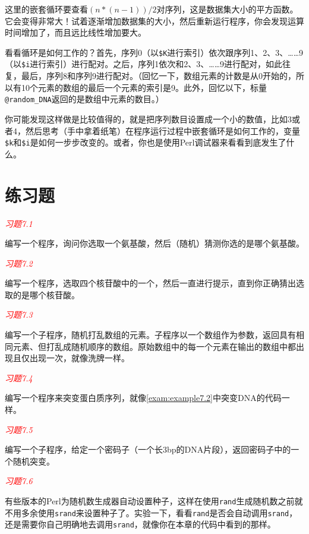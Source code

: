 这里的嵌套循环要查看$(n * (n-1)) / 2$对序列，这是数据集大小的平方函数。它会变得非常大！试着逐渐增加数据集的大小，然后重新运行程序，你会发现运算时间增加了，而且远比线性增加要大。

看看循环是如何工作的？首先，序列0（以\verb|$K|进行索引）依次跟序列1、2、3、……9（以\verb|$i|进行索引）进行配对。之后，序列1依次和2、3、……9进行配对，如此往复，最后，序列8和序列9进行配对。（回忆一下，数组元素的计数是从0开始的，所以有10个元素的数组的最后一个元素的索引是9。此外，回忆以下，标量\verb|@random_DNA|返回的是数组中元素的数目。）

你可能发现这样做是比较值得的，就是把序列数目设置成一个小的数值，比如3或者4，然后思考（手中拿着纸笔）在程序运行过程中嵌套循环是如何工作的，变量\verb|$k|和\verb|$i|是如何一步步改变的。或者，你也是使用Perl调试器来看看到底发生了什么。

\section{练习题}
\textcolor{red}{\textit{习题7.1}}
\begin{adjustwidth}{4em}{}
编写一个程序，询问你选取一个氨基酸，然后（随机）猜测你选的是哪个氨基酸。
\end{adjustwidth}

\textcolor{red}{\textit{习题7.2}}
\begin{adjustwidth}{4em}{}
编写一个程序，选取四个核苷酸中的一个，然后一直进行提示，直到你正确猜出选取的是哪个核苷酸。
\end{adjustwidth}

\textcolor{red}{\textit{习题7.3}}
\begin{adjustwidth}{4em}{}
编写一个子程序，随机打乱数组的元素。子程序以一个数组作为参数，返回具有相同元素、但打乱成随机顺序的数组。原始数组中的每一个元素在输出的数组中都出现且仅出现一次，就像洗牌一样。
\end{adjustwidth}

\textcolor{red}{\textit{习题7.4}}
\begin{adjustwidth}{4em}{}
编写一个程序来突变蛋白质序列，就像\autoref{exam:example7.2}中突变DNA的代码一样。
\end{adjustwidth}

\textcolor{red}{\textit{习题7.5}}
\begin{adjustwidth}{4em}{}
编写一个子程序，给定一个密码子（一个长3bp的DNA片段），返回密码子中的一个随机突变。
\end{adjustwidth}

\textcolor{red}{\textit{习题7.6}}
\begin{adjustwidth}{4em}{}
有些版本的Perl为随机数生成器自动设置种子，这样在使用\verb|rand|生成随机数之前就不用多余使用\verb|srand|来设置种子了。实验一下，看看\verb|rand|是否会自动调用\verb|srand|，还是需要你自己明确地去调用\verb|srand|，就像你在本章的代码中看到的那样。
\end{adjustwidth}

